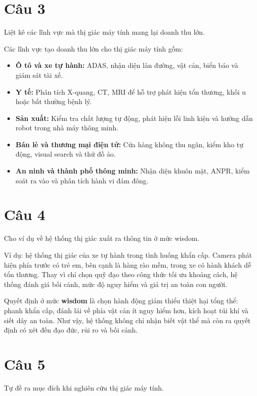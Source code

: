 \section*{Câu 3}
Liệt kê các lĩnh vực mà thị giác máy tính mang lại doanh thu lớn.

Các lĩnh vực tạo doanh thu lớn cho thị giác máy tính gồm:
\begin{itemize}
    \item \textbf{Ô tô và xe tự hành:} ADAS, nhận diện làn đường, vật cản, biển báo và giám sát tài xế.
    \item \textbf{Y tế:} Phân tích X-quang, CT, MRI để hỗ trợ phát hiện tổn thương, khối u hoặc bất thường bệnh lý.
    \item \textbf{Sản xuất:} Kiểm tra chất lượng tự động, phát hiện lỗi linh kiện và hướng dẫn robot trong nhà máy thông minh.
    \item \textbf{Bán lẻ và thương mại điện tử:} Cửa hàng không thu ngân, kiểm kho tự động, visual search và thử đồ ảo.
    \item \textbf{An ninh và thành phố thông minh:} Nhận diện khuôn mặt, ANPR, kiểm soát ra vào và phân tích hành vi đám đông.
\end{itemize}

\section*{Câu 4}
Cho ví dụ về hệ thống thị giác xuất ra thông tin ở mức wisdom.

Ví dụ: hệ thống thị giác của xe tự hành trong tình huống khẩn cấp. Camera phát hiện phía trước có trẻ em, bên cạnh là hàng rào mềm, trong xe có hành khách dễ tổn thương. Thay vì chỉ chọn quỹ đạo theo công thức tối ưu khoảng cách, hệ thống đánh giá bối cảnh, mức độ nguy hiểm và giá trị an toàn con người.

Quyết định ở mức \textbf{wisdom} là chọn hành động giảm thiểu thiệt hại tổng thể: phanh khẩn cấp, đánh lái về phía vật cản ít nguy hiểm hơn, kích hoạt túi khí và siết dây an toàn. Như vậy, hệ thống không chỉ nhận biết vật thể mà còn ra quyết định có xét đến đạo đức, rủi ro và bối cảnh.

\section*{Câu 5}
Tự đề ra mục đích khi nghiên cứu thị giác máy tính.

